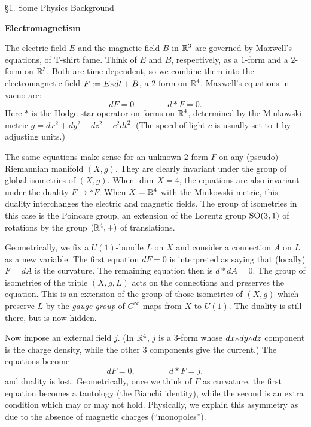 \head
\S1. Some Physics Background
\endhead

\medskip\noindent
{\bf Electromagnetism}

The electric field $E$ and the magnetic field $B$ in
${\Bbb R}^3$ are governed by Maxwell's  equations, of T-shirt
fame.
Think of $E$ and $B$, respectively, as a $1$-form and a
$2$-form on ${\Bbb R}^3$.
Both are time-dependent, so we combine them into the
electromagnetic field $F:= E\w dt+B$, a $2$-form on
${\Bbb R}^4$.
Maxwell's equations in vacuo are:
$$
dF=0\qquad\qquad d*F=0.
$$
Here $*$ is the Hodge star operator on forms on ${\Bbb R}^4$,
determined by the Minkowski metric $g=dx^2+dy^2+dz^2-c^2
dt^2$.
(The speed of light $c$ is usually set to $1$ by adjusting
units.)

The same equations make sense for an unknown $2$-form $F$ on
any (pseudo) Riemannian manifold $(X,g)$.
They are clearly invariant under the group of global
isometries of $(X,g)$. 
When $\dim\,X=4$, the equations are also invariant under the
duality $F\mapsto *F$.
When $X={\Bbb R}^4$ with the Minkowski metric, this duality
interchanges the electric and magnetic fields.
The group of isometries in this case is the Poincare group,
an extension of the Lorentz group $\text{\rm SO}(3,1)$ of rotations by
the group $({\Bbb R}^4,+)$ of translations.

Geometrically, we fix a $U(1)$-bundle $L$ on $X$ and
consider a connection $A$ on $L$ as a new variable.
The first equation $dF=0$ is interpreted as saying that
(locally) $F=dA$ is the curvature.
The remaining equation then is $d*dA=0$.
The group of isometries of the triple $(X,g,L)$ 
acts on the connections and
preserves the equation.
This is an extension of the group of those isometries of
$(X,g)$ which preserve $L$ by the {\it gauge group} of
$C^\infty$ maps from $X$ to $U(1)$.
The duality is still there, but is now hidden.

Now impose an external field $j$.
(In ${\Bbb R}^4$, $j$ is a $3$-form whose $dx\w dy\w dz$
component is the charge density, while the other $3$
components give the current.)
The equations become
$$
dF=0,\qquad\qquad d*F=j,
$$
and duality is lost.
Geometrically, once we think of $F$ as curvature,  the first
equation becomes a tautology (the Bianchi identity), while
the second is an extra condition which may or may not hold.
Physically, we explain this asymmetry as due to the absence
of magnetic charges (``monopoles'').

